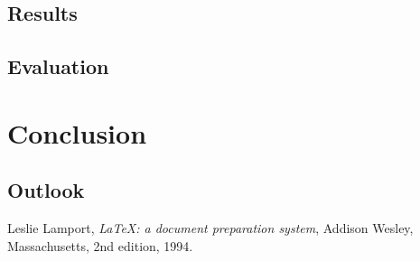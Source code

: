 \documentclass[
  twoside,
  11pt, a4paper,
  footinclude=true,
  headinclude=true,
  cleardoublepage=empty
]{scrreprt}
\begin{document}
\section{Results}
\lipsum[1]

\section{Evaluation}
\lipsum[1]

\chapter{Conclusion}
\lipsum[1]

\section{Outlook}
\lipsum[1]

\listoffigures
 
\listoftables

\begin{thebibliography}{9}
        Leslie Lamport,
        \emph{\LaTeX: a document preparation system},
        Addison Wesley, Massachusetts,
        2nd edition,
        1994.
\end{thebibliography}
    
\end{document}
